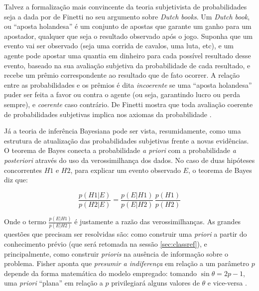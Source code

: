 Talvez a formalização mais convincente da teoria subjetivista de probabilidades seja a dada por de Finetti no seu argumento sobre
{\em Dutch books}. Um {\em Dutch book}, ou ``aposta holandesa'' 
é um conjunto de apostas que garante um ganho para um apostador, qualquer que seja o
resultado observado após o jogo. Suponha que um evento vai ser observado (seja uma corrida de cavalos, uma luta, etc), e um
agente pode apostar uma quantia em dinheiro para cada possível resultado desse evento, baseado na sua avaliação subjetiva da
probabilidade de cada resultado, e recebe um prêmio correspondente ao resultado que de fato ocorrer. A relação entre as 
probabilidades e os prêmios é dita {\em incoerente} se uma ``aposta holandesa'' puder ser feita a favor ou contra o agente
(ou seja, garantindo lucro ou perda sempre), e {\em coerente} caso contrário. De Finetti mostra que toda avaliação 
coerente de probabilidades subjetivas implica nos axiomas da probabilidade \citep{deFinetti37}.

Já a teoria de inferência Bayesiana pode ser vista, resumidamente, como uma estrutura de atualização das probabilidades subjetivas
frente a novas evidências. O teorema de Bayes conecta a probabilidade {\em a priori} com a probabilidade {\em a posteriori}
através do uso da verossimilhança dos dados. No caso de duas hipóteses concorrentes $H1$ e $H2$, para explicar um evento observado
$E$, o teorema de Bayes diz que:

\begin{equation}
	\frac{p(H1|E)}{p(H2|E)}= \frac{p(E|H1)}{p(E|H2)} \,\frac{p(H1)}{p(H2)}
\end{equation}

Onde o termo $\frac{p(E|H1)}{p(E|H2)}$ é justamente a razão das verossimilhanças.
As grandes questões que precisam ser resolvidas são: como construir uma {\em priori}
a partir do conhecimento prévio (que será retomada na sessão \ref{sec:classref}), e principalmente, como construir {\em prioris}
na ausência de informação sobre o problema. Fisher aponta que {\em presumir a indiferença} em relação a um parâmetro
$p$ depende da forma matemática do modelo empregado: tomando $\sin \theta = 2p-1$, uma {\em priori} ``plana'' em relação a $p$ 
privilegiará alguns valores de $\theta$ e vice-versa \citep{Fisher1922}.

